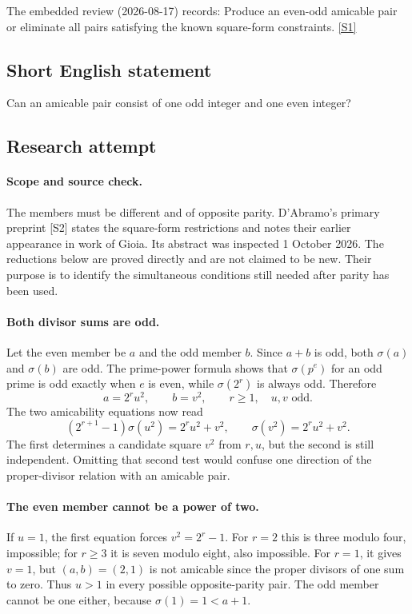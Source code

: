 \documentclass[11pt,a4paper]{article}
\newcommand{\sref}[2]{\hyperlink{source:#1:#2}{[S#2]}}
\begin{document}
The embedded review (2026-08-17) records: Produce an even-odd amicable pair or eliminate all pairs satisfying the known square-form constraints. \sref{1253}{1}

\subsection{Short English statement}

Can an amicable pair consist of one odd integer and one even integer?

\subsection{Research attempt}

\paragraph{Scope and source check.}
The members must be different and of opposite parity. D'Abramo's
primary preprint [S2] states the square-form restrictions and notes
their earlier appearance in work of Gioia. Its abstract was inspected
1 October 2026. The reductions below are proved directly and are not
claimed to be new. Their purpose is to identify the simultaneous
conditions still needed after parity has been used.

\paragraph{Both divisor sums are odd.}
Let the even member be $a$ and the odd member $b$. Since $a+b$ is odd,
both $\sigma(a)$ and $\sigma(b)$ are odd. The prime-power formula
shows that $\sigma(p^e)$ for an odd prime is odd exactly when $e$
is even, while $\sigma(2^r)$ is always odd. Therefore
\[
 a=2^r u^2,\qquad b=v^2,\qquad r\ge1,\quad u,v\text{ odd}.
\]
The two amicability equations now read
\[
 (2^{r+1}-1)\sigma(u^2)=2^r u^2+v^2,
 \qquad \sigma(v^2)=2^r u^2+v^2.
\]
The first determines a candidate square $v^2$ from $r,u$, but the
second is still independent. Omitting that second test would confuse
one direction of the proper-divisor relation with an amicable pair.

\paragraph{The even member cannot be a power of two.}
If $u=1$, the first equation forces $v^2=2^r-1$. For $r=2$ this is
three modulo four, impossible; for $r\ge3$ it is seven modulo eight,
also impossible. For $r=1$, it gives $v=1$, but $(a,b)=(2,1)$ is not
amicable since the proper divisors of one sum to zero. Thus $u>1$ in
every possible opposite-parity pair. The odd member cannot be one
either, because $\sigma(1)=1<a+1$.
\end{document}
